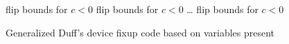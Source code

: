 \begin{figure}[H]
    \begin{algorithmic}
             \Comment flip bounds for $c < 0$
                \State {}
            \EndCase
             \Comment flip bounds for $c < 0$
                \State {}
            \EndCase
            \State \ldots
             \Comment flip bounds for $c < 0$
                \State {}
            \EndCase
        \EndSwitch
    \end{algorithmic}
    \caption{Generalized Duff's device fixup code based on variables present}
    \label{fig:impl:fixup:duff:fixup-bound}
\end{figure}